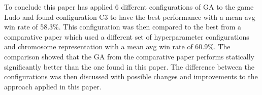 
To conclude this paper has applied 6 different configurations of GA to the game Ludo
and found configuration C3 to have the best performance with a mean avg win rate of 58.3\%.
This configuration was then compared to the best 
from a comparative paper\cite*{peter} which used a different set of hyperparameter configurations
and chromosome representation with a mean avg win rate of 60.9\%. The comparison showed that 
the GA from the comparative paper performs statically significantly better than the 
one found in this paper. The difference between the configurations was then discussed 
with possible changes and improvements to the approach applied in this paper.
